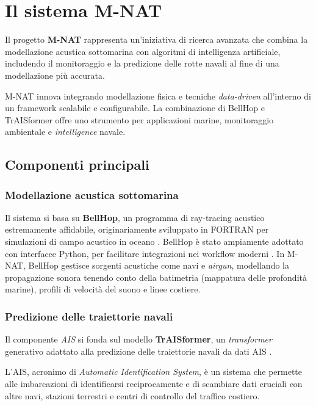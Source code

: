 \chapter{Il sistema M-NAT}

Il progetto \textbf{M-NAT} rappresenta un'iniziativa di ricerca avanzata che combina la modellazione acustica sottomarina con algoritmi di intelligenza artificiale, includendo il monitoraggio e la predizione delle rotte navali al fine di una modellazione più accurata.

M-NAT innova integrando modellazione fisica e tecniche \textit{data-driven} all'interno di un framework scalabile e configurabile. La combinazione di BellHop e TrAISformer offre uno strumento per applicazioni marine, monitoraggio ambientale e \textit{intelligence} navale.

\section{Componenti principali}

\subsection{Modellazione acustica sottomarina}

Il sistema si basa su \textbf{BellHop}, un programma di ray-tracing acustico estremamente affidabile, originariamente sviluppato in FORTRAN per simulazioni di campo acustico in oceano \cite{porter2011bellhop,long2012bellhop}. BellHop è stato ampiamente adottato con interfacce Python, per facilitare integrazioni nei workflow moderni \cite{fang2024bellhop}. In M-NAT, BellHop gestisce sorgenti acustiche come navi e \textit{airgun}, modellando la propagazione sonora tenendo conto della batimetria (mappatura delle profondità marine), profili di velocità del suono e linee costiere.

\subsection{Predizione delle traiettorie navali}

Il componente \textit{AIS} si fonda sul modello \textbf{TrAISformer}, un \textit{transformer} generativo adattato alla predizione delle traiettorie navali da dati AIS \cite{nguyen2021traisformer}. 

L'AIS, acronimo di \textit{Automatic Identification System}, è un sistema che permette alle imbarcazioni di identificarsi reciprocamente e di scambiare dati cruciali con altre navi, stazioni terrestri e centri di controllo del traffico costiero.

